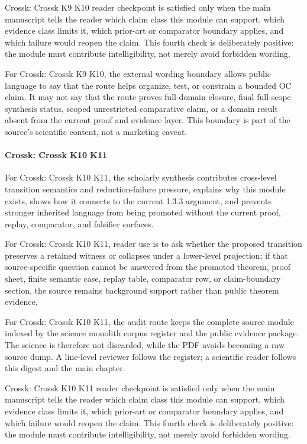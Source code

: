 Crossk: Crossk K9 K10 reader checkpoint is satisfied only when the main manuscript tells the reader which claim class this module can support, which evidence class limits it, which prior-art or comparator boundary applies, and which failure would reopen the claim. This fourth check is deliberately positive: the module must contribute intelligibility, not merely avoid forbidden wording.


For Crossk: Crossk K9 K10, the external wording boundary allows public language to say that the route helps organize, test, or constrain a bounded OC claim. It may not say that the route proves full-domain closure, final full-scope synthesis status, scoped unrestricted comparative claim, or a domain result absent from the current proof and evidence layer. This boundary is part of the source's scientific content, not a marketing caveat.


\paragraph{Crossk: Crossk K10 K11}

For Crossk: Crossk K10 K11, the scholarly synthesis contributes cross-level transition semantics and reduction-failure pressure, explains why this module exists, shows how it connects to the current 1.3.3 argument, and prevents stronger inherited language from being promoted without the current proof, replay, comparator, and falsifier surfaces.


For Crossk: Crossk K10 K11, reader use is to ask whether the proposed transition preserves a retained witness or collapses under a lower-level projection; if that source-specific question cannot be answered from the promoted theorem, proof sheet, finite semantic case, replay table, comparator row, or claim-boundary section, the source remains background support rather than public theorem evidence.


For Crossk: Crossk K10 K11, the audit route keeps the complete source module indexed by the science monolith corpus register and the public evidence package. The science is therefore not discarded, while the PDF avoids becoming a raw source dump. A line-level reviewer follows the register; a scientific reader follows this digest and the main chapter.


Crossk: Crossk K10 K11 reader checkpoint is satisfied only when the main manuscript tells the reader which claim class this module can support, which evidence class limits it, which prior-art or comparator boundary applies, and which failure would reopen the claim. This fourth check is deliberately positive: the module must contribute intelligibility, not merely avoid forbidden wording.


